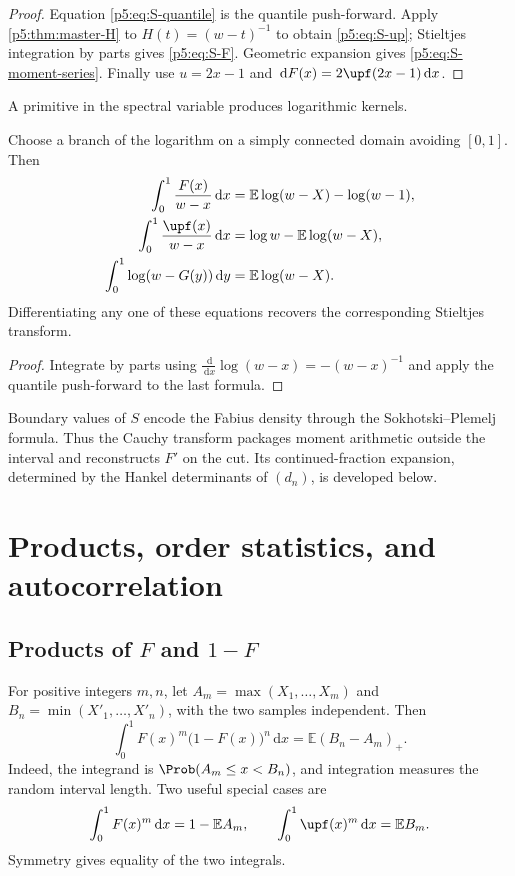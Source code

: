 \documentclass[11pt,oneside]{article}
\theoremstyle{definition}
\theoremstyle{remark}
\newcommand{\E}{\mathbb E}
\newcommand{\dd}{\,\mathrm d}
\newcommand{\1}{\mathbf 1}
\begin{document}
\begin{proof}
Equation \eqref{p5:eq:S-quantile} is the quantile push-forward.  Apply \cref{p5:thm:master-H} to $H(t)=(w-t)^{-1}$ to obtain \eqref{p5:eq:S-up}; Stieltjes integration by parts gives \eqref{p5:eq:S-F}.  Geometric expansion gives \eqref{p5:eq:S-moment-series}.  Finally use $u=2x-1$ and $\dd F(x)=2\upf(2x-1)\dd x$.
\end{proof}

A primitive in the spectral variable produces logarithmic kernels.

\begin{corollary}\label{p5:cor:logarithmic-potentials}
Choose a branch of the logarithm on a simply connected domain avoiding $[0,1]$.  Then
\begin{align}
 \int_0^1\frac{F(x)}{w-x}\dd x
 &=\E\log(w-X)-\log(w-1),\label{p5:eq:log-potential-F}\\
 \int_0^1\frac{\upf(x)}{w-x}\dd x
 &=\log w-\E\log(w-X),\label{p5:eq:log-potential-up}\\
 \int_0^1\log(w-G(y))\dd y
 &=\E\log(w-X).\label{p5:eq:log-potential-G}
\end{align}
Differentiating any one of these equations recovers the corresponding Stieltjes transform.
\end{corollary}

\begin{proof}
Integrate by parts using $\frac{\dd}{\dd x}\log(w-x)=-(w-x)^{-1}$ and apply the quantile push-forward to the last formula.
\end{proof}

Boundary values of $S$ encode the Fabius density through the Sokhotski--Plemelj formula.  Thus the Cauchy transform packages moment arithmetic outside the interval and reconstructs $F'$ on the cut.  Its continued-fraction expansion, determined by the Hankel determinants of $(d_n)$, is developed below.

\section{Products, order statistics, and autocorrelation}\label{p5:sec:products-correlations}

\subsection{Products of $F$ and $1-F$}

For positive integers $m,n$, let $A_m=\max(X_1,\ldots,X_m)$ and $B_n=\min(X'_1,\ldots,X'_n)$, with the two samples independent.  Then
\begin{equation}\label{p5:eq:order-statistic-product}
 \int_0^1F(x)^m\bigl(1-F(x)\bigr)^n\dd x
 =\E(B_n-A_m)_+.
\end{equation}
Indeed, the integrand is $\Prob(A_m\le x<B_n)$, and integration measures the random interval length.  Two useful special cases are
\begin{equation}\label{p5:eq:powers-order-statistics}
 \int_0^1F(x)^m\dd x=1-\E A_m,
 \qquad
 \int_0^1\upf(x)^m\dd x=\E B_m.
\end{equation}
Symmetry gives equality of the two integrals.
\end{document}
